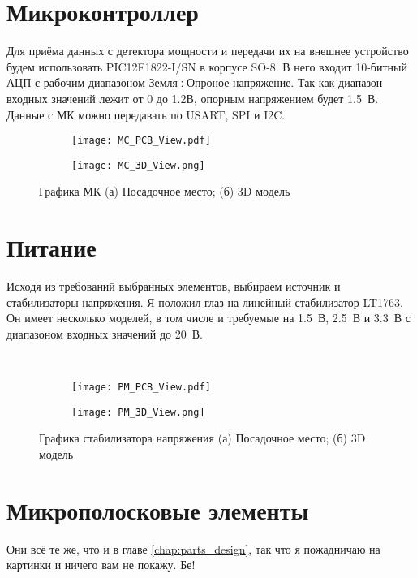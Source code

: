 \section{Микроконтроллер}

Для приёма данных с детектора мощности и передачи их на внешнее устройство будем использовать PIC12F1822-I/SN в корпусе SO-8. В него входит 10-битный АЦП с рабочим диапазоном Земля$\div$Опроное напряжение. Так как диапазон входных значений лежит от 0 до 1.2В, опорным напряжением будет 1.5~В. Данные с МК можно передавать по USART, SPI и I2C.


\begin{figure}[H]
	\centering
	\begin{subfigure}[b]{0.45\textwidth}
		\centering
		\texttt{[image: MC\_PCB\_View.pdf]}
		\caption{}%
		\label{fig:MC_PCB_View}
	\end{subfigure}
	\hfill
	\begin{subfigure}[b]{0.45\textwidth}
		\centering
		\texttt{[image: MC\_3D\_View.png]}
		\caption{}%
		\label{fig:MC_3D_View}
	\end{subfigure}
	\caption{%
		Графика МК
		(а) Посадочное место;
		(б) 3D модель
	}%
	\label{fig:MC_footprint}
\end{figure}

\section{Питание}

Исходя из требований выбранных элементов, выбираем источник и стабилизаторы напряжения. Я положил глаз на линейный стабилизатор \href{https://www.analog.com/ru/products/lt1763.html}{LT1763}. Он имеет несколько моделей, в том числе и требуемые на 1.5~В, 2.5~В и 3.3~В с диапазоном входных значений до 20~В.

\begin{figure}[H]
	\centering\
	\begin{subfigure}[b]{0.45\textwidth}
		\centering
		\texttt{[image: PM\_PCB\_View.pdf]}
		\caption{}%
		\label{fig:PM_PCB_View}
	\end{subfigure}
	\hfill
	\begin{subfigure}[b]{0.45\textwidth}
		\centering
		\texttt{[image: PM\_3D\_View.png]}
		\caption{}%
		\label{fig:PM_3D_View}
	\end{subfigure}
	\caption{%
		Графика стабилизатора напряжения
		(а) Посадочное место;
		(б) 3D модель
	}%
	\label{fig:PM_footprint}
\end{figure}

\section*{Микрополосковые элементы}

Они всё те же, что и в главе \ref{chap:parts_design}, так что я пожадничаю на картинки и ничего вам не покажу. Бе!

